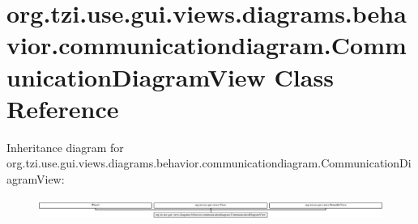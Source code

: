 \hypertarget{classorg_1_1tzi_1_1use_1_1gui_1_1views_1_1diagrams_1_1behavior_1_1communicationdiagram_1_1_communication_diagram_view}{\section{org.\-tzi.\-use.\-gui.\-views.\-diagrams.\-behavior.\-communicationdiagram.\-Communication\-Diagram\-View Class Reference}
\label{classorg_1_1tzi_1_1use_1_1gui_1_1views_1_1diagrams_1_1behavior_1_1communicationdiagram_1_1_communication_diagram_view}
}
Inheritance diagram for org.\-tzi.\-use.\-gui.\-views.\-diagrams.\-behavior.\-communicationdiagram.\-Communication\-Diagram\-View\-:\begin{figure}[H]
\begin{center}
\leavevmode
\includegraphics[height=0.690080cm]{classorg_1_1tzi_1_1use_1_1gui_1_1views_1_1diagrams_1_1behavior_1_1communicationdiagram_1_1_communication_diagram_view}
\end{center}
\end{figure}

